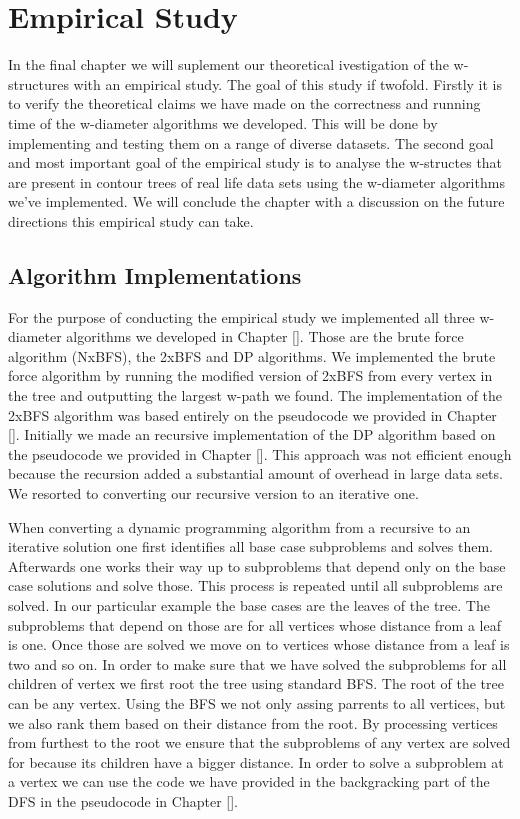 \chapter{Empirical Study}
\label{chapter7}

In the final chapter we will suplement our theoretical ivestigation of the w-structures with an empirical study. The goal of this study if twofold. Firstly it is to verify the theoretical claims we have made on the correctness and running time of the w-diameter algorithms we developed. This will be done by implementing and testing them on a range of diverse datasets. The second goal and most important goal of the empirical study is to analyse the w-structes that are present in contour trees of real life data sets using the w-diameter algorithms we've implemented. We will conclude the chapter with a discussion on the future directions this empirical study can take.

\section{Algorithm Implementations}

For the purpose of conducting the empirical study we implemented all three w-diameter algorithms we developed in Chapter []. Those are the brute force algorithm (NxBFS), the 2xBFS and DP algorithms.  We implemented the brute force algorithm by running the modified version of 2xBFS from every vertex in the tree and outputting the largest w-path we found. The implementation of the 2xBFS algorithm was based entirely on the pseudocode we provided in Chapter []. Initially we made an recursive implementation of the DP algorithm based on the pseudocode we provided in Chapter []. This approach was not efficient enough because the recursion added a substantial amount of overhead in large data sets. We resorted to converting our recursive version to an iterative one.

When converting a dynamic programming algorithm from a recursive to an iterative solution one first identifies all base case subproblems and solves them. Afterwards one works their way up to subproblems that depend only on the base case solutions and solve those. This process is repeated until all subproblems are solved. In our particular example the base cases are the leaves of the tree. The subproblems that depend on those are for all vertices whose distance from a leaf is one. Once those are solved we move on to vertices whose distance from a leaf is two and so on. In order to make sure that we have solved the subproblems for all children of vertex we first root the tree using standard BFS. The root of the tree can be any vertex. Using the BFS we not only assing parrents to all vertices, but we also rank them based on their distance from the root. By processing vertices from furthest to the root we ensure that the subproblems of any vertex are solved for because its children have a bigger distance. In order to solve a subproblem at a vertex we can use the code we have provided in the backgracking part of the DFS in the pseudocode in Chapter [].

